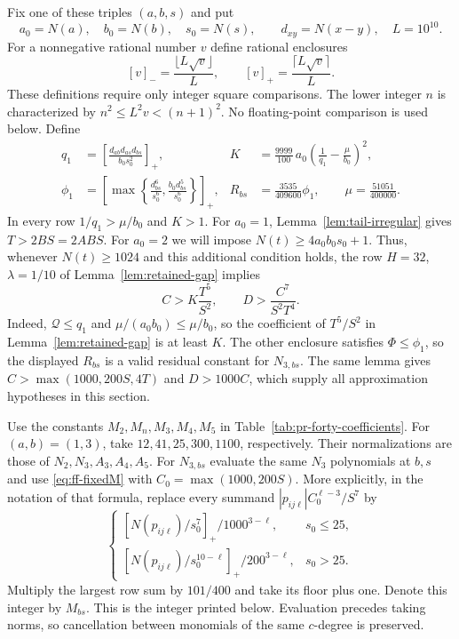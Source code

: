 \documentclass[12pt]{article}
\numberwithin{equation}{section}
\begin{document}
Fix one of these triples $(a,b,s)$ and put
\[
 a_0=N(a),\quad b_0=N(b),\quad s_0=N(s),\qquad
 d_{xy}=N(x-y),\quad L=10^{10}.
\]
For a nonnegative rational number $v$ define rational enclosures
\[
 [v]_- =\frac{\lfloor L\sqrt v\rfloor}{L},\qquad
 [v]_+ =\frac{\lceil L\sqrt v\rceil}{L}.
\]
These definitions require only integer square comparisons. The lower
integer $n$ is characterized by $n^2\le L^2v<(n+1)^2$.
No floating-point comparison is used below. Define
\begin{align*}
 q_1&=\left[\frac{d_{ab}d_{as}d_{bs}}{b_0s_0^2}\right]_+,
 &K&=\frac{9999}{100}\,a_0
       \left(\frac1{q_1}-\frac{\mu}{b_0}\right)^2,\\
 \phi_1&=\left[\max\left\{\frac{d_{bs}^6}{s_0^6},
                  \frac{b_0d_{bs}^5}{s_0^6}\right\}\right]_+,
 &R_{bs}&=\frac{3535}{409600}\phi_1,
 \qquad \mu=\frac{51051}{400000}.
\end{align*}
In every row $1/q_1>\mu/b_0$ and $K>1$.
For $a_0=1$, Lemma~\ref{lem:tail-irregular} gives $T>2BS=2ABS$.
For $a_0=2$ we will impose $N(t)\ge4a_0b_0s_0+1$.
Thus, whenever $N(t)\ge1024$ and this additional condition holds,
the row $H=32$, $\lambda=1/10$ of Lemma~\ref{lem:retained-gap}
implies
\begin{equation}\label{eq:fixed56-gap}
 C>K\frac{T^5}{S^2},\qquad
 D>\frac{C^7}{S^2T^4}.
\end{equation}
Indeed, $\mathcal Q\le q_1$ and $\mu/(a_0b_0)\le\mu/b_0$,
so the coefficient of $T^5/S^2$ in Lemma~\ref{lem:retained-gap}
is at least $K$. The other enclosure satisfies $\Phi\le\phi_1$, so the
displayed $R_{bs}$ is a valid residual constant for $N_{3,bs}$.
The same lemma gives $C>\max(1000,200S,4T)$ and $D>1000C$,
which supply all approximation hypotheses in this section.

Use the constants $M_2,M_n,M_3,M_4,M_5$ in
Table~\ref{tab:pr-forty-coefficients}. For $(a,b)=(1,3)$, take
$12,41,25,300,1100$, respectively. Their normalizations are those of
$N_2,N_3,A_3,A_4,A_5$.
For $N_{3,bs}$ evaluate the same $N_3$ polynomials at $b,s$ and use
\eqref{eq:ff-fixedM} with $C_0=\max(1000,200S)$.
More explicitly, in the notation of that formula, replace every
summand $|p_{ij\ell}|C_0^{\ell-3}/S^7$ by
\[
 \begin{cases}
 [N(p_{ij\ell})/s_0^7]_+/1000^{3-\ell},&s_0\le25,\\
 [N(p_{ij\ell})/s_0^{10-\ell}]_+/200^{3-\ell},&s_0>25.
 \end{cases}
\]
Multiply the largest row sum by $101/400$ and take its floor plus one.
Denote this integer by $M_{bs}$.
This is the integer printed below. Evaluation precedes taking norms,
so cancellation between monomials of the same $c$-degree is preserved.
\end{document}
